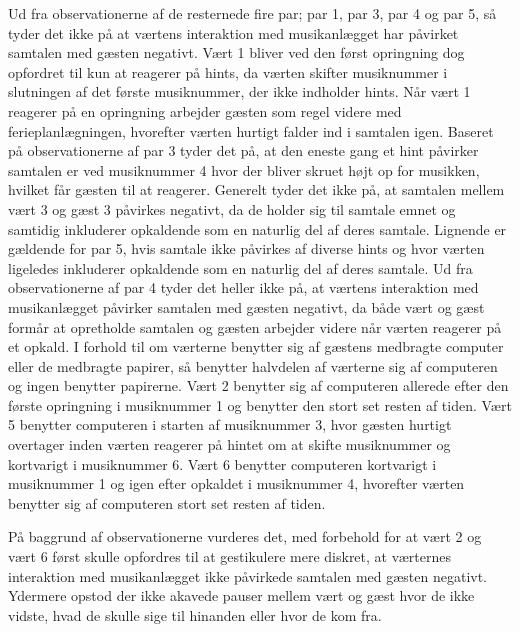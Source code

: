 Ud fra observationerne af de resternede fire par; par 1, par 3, par 4 og par 5, så tyder det ikke på at værtens interaktion med musikanlægget har påvirket samtalen med gæsten negativt. Vært 1 bliver ved den først opringning dog opfordret til kun at reagerer på hints, da værten skifter musiknummer i slutningen af det første musiknummer, der ikke indholder hints. Når vært 1 reagerer på en opringning arbejder gæsten som regel videre med ferieplanlægningen, hvorefter værten hurtigt falder ind i samtalen igen. Baseret på observationerne af par 3 tyder det på, at den eneste gang et hint påvirker samtalen er ved musiknummer 4 hvor der bliver skruet højt op for musikken, hvilket får gæsten til at reagerer. Generelt tyder det ikke på, at samtalen mellem vært 3 og gæst 3 påvirkes negativt, da de holder sig til samtale emnet og samtidig inkluderer opkaldende som en naturlig del af deres samtale. Lignende er gældende for par 5, hvis samtale ikke påvirkes af diverse hints og hvor værten ligeledes inkluderer opkaldende som en naturlig del af deres samtale. Ud fra observationerne af par 4 tyder det heller ikke på, at værtens interaktion med musikanlægget påvirker samtalen med gæsten negativt, da både vært og gæst formår at opretholde samtalen og gæsten arbejder videre når værten reagerer på et opkald. \blankline
%
I forhold til om værterne benytter sig af gæstens medbragte computer eller de medbragte papirer, så benytter halvdelen af værterne sig af computeren og ingen benytter papirerne. Vært 2 benytter sig af computeren allerede efter den første opringning i musiknummer 1 og benytter den stort set resten af tiden. Vært 5 benytter computeren i starten af musiknummer 3, hvor gæsten hurtigt overtager inden værten reagerer på hintet om at skifte musiknummer og kortvarigt i musiknummer 6. Vært 6 benytter computeren kortvarigt i musiknummer 1 og igen efter opkaldet i musiknummer 4, hvorefter værten benytter sig af computeren stort set resten af tiden. 

På baggrund af observationerne vurderes det, med forbehold for at vært 2 og vært 6 først skulle opfordres til at gestikulere mere diskret, at værternes interaktion med musikanlægget ikke påvirkede samtalen med gæsten negativt. Ydermere opstod der ikke akavede pauser mellem vært og gæst hvor de ikke vidste, hvad de skulle sige til hinanden eller hvor de kom fra. 

